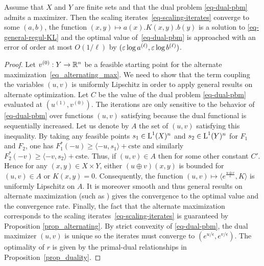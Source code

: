 \begin{theorem}
\label{prop_convergencediscrete}
Assume that $X$ and $Y$ are finite sets and that the dual problem \eqref{eq-dual-pbm} admits a maximizer.
%
Then the scaling iterates~\eqref{eq-scaling-iterates} converge to some $(a,b)$, the function $(x,y) \mapsto a(x).K(x,y).b(y)$ is a solution to \eqref{eq-general-regul-KL} and the optimal value of~\eqref{eq-dual-pbm} is approached with an error of order at most $O(1/\ell)$ by $(\varepsilon \log a^{(\ell)}, \varepsilon \log b^{(\ell)})$.
\end{theorem}
\begin{proof}
Let $v^{(0)} : Y\to \mathbb{R}^n$ be a feasible starting point for the alternate maximization~\eqref{eq_alternating_max}. We need to show that the term coupling the variables $(u,v)$ is uniformly Lipschitz in order to apply general results on alternate optimization. Let $C$ be the value of the dual problem \eqref{eq-dual-pbm} evaluated at $(u^{(1)},v^{(0)})$. The iterations are only sensitive to the behavior of \eqref{eq-dual-pbm} over functions $(u,v)$ satisfying
because the dual functional is sequentially increased. Let us denote by $A$ the set of $(u,v)$ satisfying this inequality. By taking any feasible points $s_1 \in \text{\upshape L}^1(X)^n$ and $s_2\in \text{\upshape L}^1(Y)^n$ for $F_1$ and $F_2$, one has $F_1^*(-u)\geq \langle -u, s_1\rangle+\text{cste}$ and similarly $F_2^*(-v)\geq \langle -v, s_2\rangle+\text{cste}$. Thus, if $(u,v)\in A$ then
for some other constant $C'$. Hence for any $(x,y)\in X\times Y$, either $(u\oplus v)(x,y)$ is bounded for $(u,v)\in A$ or $K(x,y)=0$.
%
Consequently, the function $(u,v)\mapsto \langle e^{\frac{u\oplus v}{\epsilon}}, K\rangle$ is uniformly Lipschitz on $A$. It is moreover smooth and thus general results on alternate maximization (such as \cite{beck2015convergence}) gives the convergence to the optimal value and the convergence rate.
%
Finally, the fact that the alternate maximization corresponds to the scaling iterates~\eqref{eq-scaling-iterates} is guaranteed by Proposition \ref{prop_alternating}. By strict convexity of \eqref{eq-dual-pbm}, the dual maximizer $(u,v)$ is unique so the iterates must converge to $(e^{u/\epsilon}, e^{v/\epsilon})$. The optimality of $r$ is given by the primal-dual relationships in Proposition~\ref{prop_duality}.
\end{proof}

